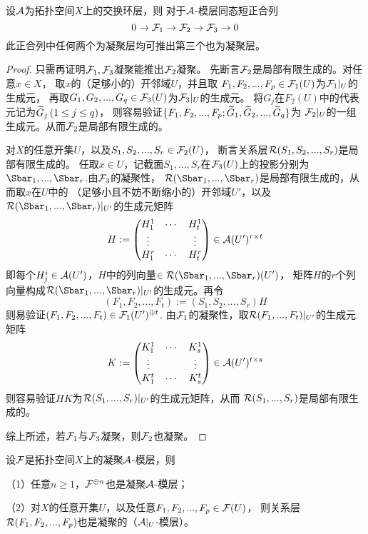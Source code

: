 \begin{prop}设$\mathcal{A}$为拓扑空间$X$上的交换环层，则
对于$\mathcal{A}$-模层同态短正合列
$$
  0\to\mathcal{F}_1\to\mathcal{F}_2\to\mathcal{F}_3\to 0
$$
此正合列中任何两个为凝聚层均可推出第三个也为凝聚层。
\label{凝聚短正合列-prop}
\end{prop}

\begin{proof}
  只需再证明$\mathcal{F}_1,\mathcal{F}_3$凝聚能推出$\mathcal{F}_2$凝聚。
先断言$\mathcal{F}_2$是局部有限生成的。对任意$x\in X$，
取$x$的（足够小的）开邻域$U$，并且取
$F_1,F_2,...,F_p\in\mathcal{F}_1(U)$为$\mathcal{F}_1|_U$的生成元，
再取$G_1,G_2,...,G_q\in\mathcal{F}_3(U)$为$\mathcal{F}_3|_U$的生成元。
将$G_j$在$F_2(U)$中的代表元记为$\widetilde{G}_j\,(1\leq j\leq q)$，
则容易验证$\{F_1,F_2,...,F_p;\widetilde{G}_1,\widetilde{G}_2,...,\widetilde{G}_q\}$为
$\mathcal{F}_2|_U$的一组生成元。从而$\mathcal{F}_2$是局部有限生成的。

对$X$的任意开集$U$，以及$S_1,S_2,...,S_r\in\mathcal{F}_2(U)$，
断言关系层$\mathcal{R}(S_1,S_2,...,S_r)$是局部有限生成的。
任取$x\in U$，记截面$S_1,...,S_r$在$\mathcal{F}_3(U)$上的投影分别为
$\Sbar_1,...,\Sbar_r$.由$\mathcal{F}_3$的凝聚性，
$\mcalR(\Sbar_1,...,\Sbar_r)$是局部有限生成的，从而取$x$在$U$中的
（足够小且不妨不断缩小的）开邻域$U'$，以及
$\mcalR(\Sbar_1,...,\Sbar_r)|_{U'}$的生成元矩阵
$$
   H
:=
  \begin{pmatrix}
    H_1^1  & \cdots & H_t^1 \\
    \vdots &        & \vdots\\
    H_1^r  & \cdots & H_t^r
  \end{pmatrix}
\in
  \mathcal{A}(U')^{r\times t}
$$
即每个$H_j^i\in\mathcal{A}(U')$，$H$中的列向量$\in\mcalR(\Sbar_1,...,\Sbar_r)(U')$，
矩阵$H$的$r$个列向量构成$\mcalR(\Sbar_1,...,\Sbar_r)|_{U'}$的生成元。再令
$$
  (F_1,F_2,...,F_t)
:=(S_1,S_2,...,S_r)H
$$
则易验证$(F_1,F_2,...,F_t)\in\mathcal{F}_1(U')^{\oplus t}$.
由$\mathcal{F}_1$的凝聚性，取$\mathcal{R}(F_1,...,F_t)|_{U'}$的生成元矩阵
$$
   K
:=
  \begin{pmatrix}
    K_1^1  & \cdots & K_s^1 \\
    \vdots &        & \vdots\\
    K_1^t  & \cdots & K_s^t
  \end{pmatrix}
\in
  \mathcal{A}(U')^{t\times s}
$$
则容易验证$HK$为$\mathcal{R}(S_1,...,S_r)|_{U'}$的生成元矩阵，从而
$\mathcal{R}(S_1,...,S_r)$是局部有限生成的。

综上所述，若$\mathcal{F}_1$与$\mathcal{F}_3$凝聚，则$\mathcal{F}_2$也凝聚。
\end{proof}

\begin{cor}设$\mathcal{F}$是拓扑空间$X$上的凝聚$\mathcal{A}$-模层，则

（1）任意$n\geq 1$，$\mathcal{F}^{\oplus n}$也是凝聚$\mathcal{A}$-模层；

（2）对$X$的任意开集$U$，以及任意$F_1,F_2,...,F_p\in\mathcal{F}(U)$，
则关系层$\mathcal{R}(F_1,F_2,...,F_p)$也是凝聚的（$\mathcal{A}|_U$-模层）。
\end{cor}

